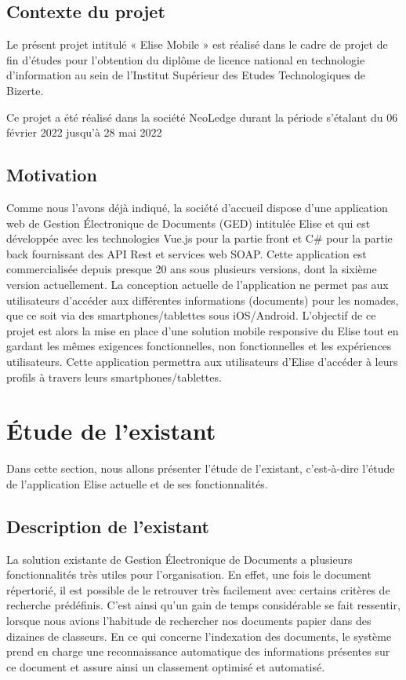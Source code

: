 \subsection{Contexte du projet}
Le présent projet intitulé « Elise Mobile » est réalisé dans le cadre de projet de fin d'études pour l'obtention du diplôme de licence national en technologie d'information au sein de l'Institut Supérieur des Etudes Technologiques de Bizerte.

Ce projet a été réalisé dans la société NeoLedge durant la période s'étalant du 06 février 2022 jusqu'à 28 mai 2022

\subsection{Motivation}
Comme nous l'avons déjà indiqué, la société d'accueil dispose d'une application web de Gestion Électronique de Documents (GED) intitulée Elise et qui est développée avec les technologies Vue.js pour la partie front et C\# pour la partie back fournissant des API Rest et services web SOAP. Cette application est commercialisée depuis presque 20 ans sous plusieurs versions, dont la sixième version actuellement. La conception actuelle de l'application ne permet pas aux utilisateurs d'accéder aux différentes informations (documents) pour les nomades, que ce soit via des smartphones/tablettes sous iOS/Android.
L'objectif de ce projet est alors la mise en place d'une solution mobile responsive du Elise tout en gardant les mêmes exigences fonctionnelles, non fonctionnelles et les expériences utilisateurs. Cette application permettra aux utilisateurs d'Elise d'accéder à leurs profils à travers leurs smartphones/tablettes.

\section{Étude de l'existant}
Dans cette section, nous allons présenter l'étude de l'existant, c'est-à-dire l'étude de l'application Elise actuelle et de ses fonctionnalités.
\subsection{Description de l'existant}
La solution existante de Gestion Électronique de Documents a plusieurs fonctionnalités très utiles pour l'organisation. En effet, une fois le document répertorié, il est possible de le retrouver très facilement avec certains critères de recherche prédéfinis. C'est ainsi qu'un gain de temps considérable se fait ressentir, lorsque nous avions l'habitude de rechercher nos documents papier dans des dizaines de classeurs. En ce qui concerne l'indexation des documents, le système prend en charge une reconnaissance automatique des informations présentes sur ce document et assure ainsi un classement optimisé et automatisé.

